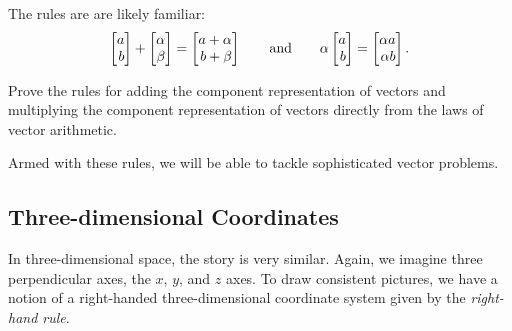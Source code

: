 The rules are are likely familiar:
\[
	\mat{a\\b}+\mat{\alpha\\\beta} = \mat{a+\alpha\\b+\beta}
	\qquad\text{and}\qquad
	\alpha \mat{a\\b}=\mat{\alpha a\\\alpha b}.
\]

\begin{exercise}
	Prove the rules for adding the component representation
	of vectors and multiplying the component representation 
	of vectors directly from the laws of vector arithmetic.
\end{exercise}

Armed with these rules, we will be able to tackle sophisticated vector
problems.

\subsection{Three-dimensional Coordinates}
In three-dimensional space, the story is very similar.  Again, we imagine
three perpendicular axes, the $x$, $y$, and $z$ axes.  
To draw consistent
pictures, we have a notion of a right-handed three-dimensional coordinate
system given by the \emph{right-hand rule}.

